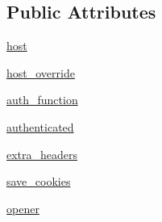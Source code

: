 \subsection*{Public Attributes}
\begin{DoxyCompactItemize}
\item 
\mbox{\hyperlink{classupload_1_1_abstract_rpc_server_ab7188d827e2faddcf970f524f5856192}{host}}
\item 
\mbox{\hyperlink{classupload_1_1_abstract_rpc_server_a783a4a7e4ffb776a57a3f267300a213b}{host\+\_\+override}}
\item 
\mbox{\hyperlink{classupload_1_1_abstract_rpc_server_aee0090a3bcf07b913a7dd596a5dabb8f}{auth\+\_\+function}}
\item 
\mbox{\hyperlink{classupload_1_1_abstract_rpc_server_a692955750c802e461c6336d3000cd365}{authenticated}}
\item 
\mbox{\hyperlink{classupload_1_1_abstract_rpc_server_adbbf0109afc13d58d7815fa143cb779f}{extra\+\_\+headers}}
\item 
\mbox{\hyperlink{classupload_1_1_abstract_rpc_server_affe342205c4647d41b127f5a5634858b}{save\+\_\+cookies}}
\item 
\mbox{\hyperlink{classupload_1_1_abstract_rpc_server_aa931446476e0e86f3ade7fef0a0aea5a}{opener}}
\end{DoxyCompactItemize}
